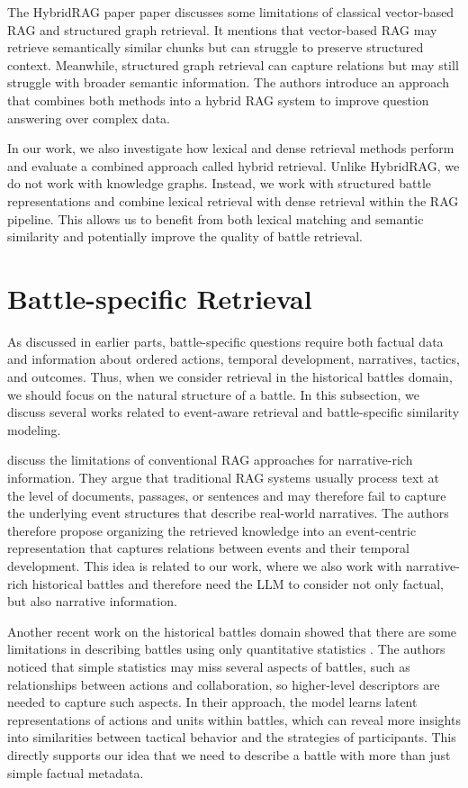 The HybridRAG paper \citep{sarmah2024hybridrag} paper discusses some limitations of classical vector-based RAG and structured graph retrieval. It mentions that vector-based RAG may retrieve semantically similar chunks but can struggle to preserve structured context. Meanwhile, structured graph retrieval can capture relations but may still struggle with broader semantic information. The authors introduce an approach that combines both methods into a hybrid RAG system to improve question answering over complex data. 

In our work, we also investigate how lexical and dense retrieval methods perform and evaluate a combined approach called hybrid retrieval. Unlike HybridRAG, we do not work with knowledge graphs. Instead, we work with structured battle representations and combine lexical retrieval with dense retrieval within the RAG pipeline. This allows us to benefit from both lexical matching and semantic similarity and potentially improve the quality of battle retrieval.
\section{Battle-specific Retrieval}
As discussed in earlier parts, battle-specific questions require both factual data and information about ordered actions, temporal development, narratives, tactics, and outcomes. Thus, when we consider retrieval in the historical battles domain, we should focus on the natural structure of a battle. In this subsection, we discuss several works related to event-aware retrieval and battle-specific similarity modeling.

\citet{yang2025eventrag} discuss the limitations of conventional RAG approaches for narrative-rich information. They argue that traditional RAG systems usually process text at the level of documents, passages, or sentences and may therefore fail to capture the underlying event structures that describe real-world narratives. The authors therefore propose organizing the retrieved knowledge into an event-centric representation that captures relations between events and their temporal development. This idea is related to our work, where we also work with narrative-rich historical battles and therefore need the LLM to consider not only factual, but also narrative information.

Another recent work on the historical battles domain showed that there are some limitations in describing battles using only quantitative statistics \citep{coulson2023actionclusters}. The authors noticed that simple statistics may miss several aspects of battles, such as relationships between actions and collaboration, so higher-level descriptors are needed to capture such aspects. In their approach, the model learns latent representations of actions and units within battles, which can reveal more insights into similarities between tactical behavior and the strategies of participants. This directly supports our idea that we need to describe a battle with more than just simple factual metadata.

